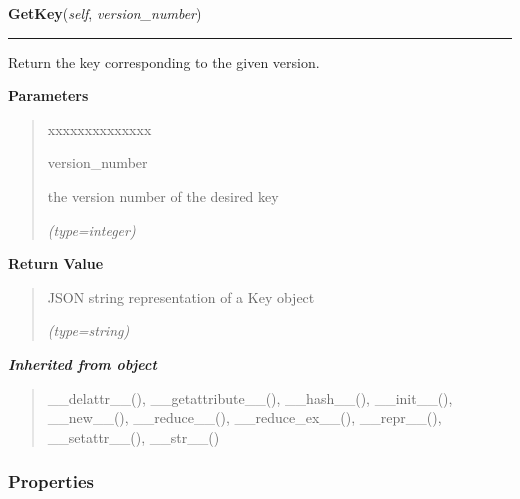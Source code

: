 \hspace{.8\funcindent}\begin{boxedminipage}{\funcwidth}

    \raggedright \textbf{GetKey}(\textit{self}, \textit{version\_number})

    \vspace{-1.5ex}

    \rule{\textwidth}{0.5\fboxrule}
\setlength{\parskip}{2ex}
    Return the key corresponding to the given version.

\setlength{\parskip}{1ex}
      \textbf{Parameters}
      \vspace{-1ex}

      \begin{quote}
        \begin{Ventry}{xxxxxxxxxxxxxx}

          \item[version\_number]

          the version number of the desired key

            {\it (type=integer)}

        \end{Ventry}

      \end{quote}

      \textbf{Return Value}
    \vspace{-1ex}

      \begin{quote}
      JSON string representation of a Key object

      {\it (type=string)}

      \end{quote}

    \end{boxedminipage}


\large{\textbf{\textit{Inherited from object}}}

\begin{quote}
\_\_delattr\_\_(), \_\_getattribute\_\_(), \_\_hash\_\_(), \_\_init\_\_(), \_\_new\_\_(), \_\_reduce\_\_(), \_\_reduce\_ex\_\_(), \_\_repr\_\_(), \_\_setattr\_\_(), \_\_str\_\_()
\end{quote}


  \subsubsection{Properties}

